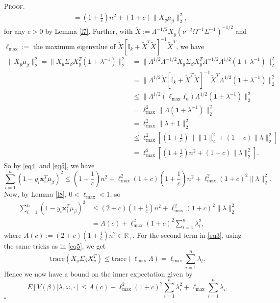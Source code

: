 \documentclass[12pt]{article}
\newcounter{ProofCounter}
\newenvironment{Proof}{\stepcounter{ProofCounter}\textsc{Proof.}}{\hfill$\square$}
\begin{document}
\begin{Proof}
\begin{align}
    & = \left( 1 + \frac{1}{c} \right) n^2 + (1 + c)\|X_y \mu_\beta \|_2^2,
    \label{eq4}
  \end{align}
  for any $c > 0$ by Lemma \ref{l7}. Further, with $\tilde{X} := \Lambda^{-1/2}X_{y}(\nu^{-2}\Omega^{-1}\Sigma^{-1})^{-1/2}$ and 
  $\ell_{\max} :=$ the maximum eigenvalue of $\tilde{X}[\mathbb{I}_k + \tilde{X}^T \tilde{X}]^{-1} \tilde{X}^T$, we have
  \begin{align}
    \| X_{y} \mu_{\beta}\|_{2}^{2} = \|X_{y}\Sigma_{\beta} X_{y}^T (\bm{1} + \lambda^{-1})\|_{2}^{2} 
    & = \| \Lambda^{1/2}\Lambda^{-1/2} X_{y}\Sigma_{\beta}X_{y}^T \Lambda^{-1/2} \Lambda^{1/2} (\bm{1} + \lambda^{-1})\|_{2}^{2} \nonumber \\
    & = \| \Lambda^{1/2} \tilde{X}[ \mathbb{I}_{k} + \tilde{X}^T \tilde{X} ]^{-1} \tilde{X}^T \Lambda^{1/2} (\mathbf{1} + \lambda^{-1})\|_{2}^{2} \nonumber \\
    & \leq \| \Lambda^{1/2} (\ell_{\max}I_{n}) \Lambda^{1/2}  (\mathbf{1} + \lambda^{-1})\|_{2}^{2} \nonumber \\
    & = \ell_{\max}^2 \| \Lambda (\mathbf{1} + \lambda^{-1})\|_{2}^{2} \nonumber \\
    & = \ell_{\max}^2 \| \lambda + 1\|_{2}^{2} \nonumber \\
    & \leq \ell_{\max}^2 \left[ \left( 1 + \frac{1}{c} \right)\| \|1\|_{2}^{2} + (1 + c) \|\lambda \|_{2}^{2}\right] \nonumber \\
    & = \ell_{\max}^2 \left[ \left( 1 + \frac{1}{c} \right) n^2 + (1 + c) \|\lambda \|_{2}^{2}\right].
    \label{eq5}
  \end{align}
  So by \eqref{eq4} and \eqref{eq5}, we have 
  \[
    \sum_{i=1}^{n} ( 1 - y_i \bm{x}_i^T \mu_\beta )^2 \leq \left( 1 + \frac{1}{c} \right)n^2 + \ell_{\max}^2(1 + c)\left( 1 + \frac{1}{c}\right) n^2 
    + \ell_{\max}^2 (1 + c)^2 \|\lambda\|_2^2.
  \]
  Now, by Lemma \ref{l8}, $0 < \ell_{\max} < 1$, so
  \begin{align}
    \sum_{i=1}^{n} ( 1 - y_i \bm{x}_i^T \mu_\beta )^2 & \leq (2 + c)\left( 1 + \frac{1}{c} \right)n^2 + \ell_{\max}^2 (1 + c)^2 \|\lambda\|_2^2
    \nonumber \\
    & = A(c) + \ell_{\max}^2(1 + c)^2 \sum_{i=1}^{n} \lambda_i^2,
    \label{eq6}
  \end{align}
  where $A(c) := (2 + c)\left( 1 + \frac{1}{c} \right) n^2 \in \mathbb{R}_{+}$.
  For the second term in \eqref{eq3}, using the same tricks as in \eqref{eq5}, we get
  \begin{equation}
    \text{trace}(X_y \Sigma_\beta X_{y}^T) \leq \text{trace}(\ell_{\max} \Lambda) = \ell_{\max} \sum_{i=1}^{n} \lambda_i.
    \label{eq7}
  \end{equation}
  Hence we now have a bound on the inner expectation given by 
  \begin{equation}
    E[V(\beta) | \lambda, \omega, \cdot] \leq A(c) + \ell_{\max}^2(1 + c)^2 \sum_{i=1}^{n} \lambda_i^2 + \ell_{\max} \sum_{i=1}^{n} \lambda_i.
    \label{eq9}
  \end{equation}
\end{Proof}
\end{document}
